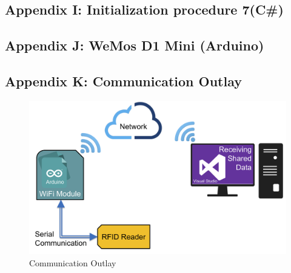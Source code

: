 \subsection{Appendix I: Initialization procedure 7(C\#)}\label{Sec_AppC}
\scriptsize


\pagebreak
\subsection{Appendix J: WeMos D1 Mini (Arduino)}\label{Sec_AppD}
\scriptsize

\pagebreak

\subsection{Appendix K: Communication Outlay}\label{Sec_AppE}
\begin{figure}[!htbp]
	\centering
	\includegraphics[width = 15cm]{Pictures/communication}
	\caption{Communication Outlay}
	\label{com}
\end{figure}
\pagebreak
